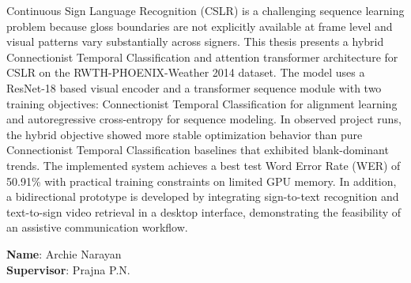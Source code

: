 \begin{singlespace}
Continuous Sign Language Recognition (CSLR) is a challenging sequence learning problem because gloss boundaries are not explicitly available at frame level and visual patterns vary substantially across signers. This thesis presents a hybrid Connectionist Temporal Classification and attention transformer architecture for CSLR on the RWTH-PHOENIX-Weather 2014 dataset. The model uses a ResNet-18 based visual encoder and a transformer sequence module with two training objectives: Connectionist Temporal Classification for alignment learning and autoregressive cross-entropy for sequence modeling. In observed project runs, the hybrid objective showed more stable optimization behavior than pure Connectionist Temporal Classification baselines that exhibited blank-dominant trends. The implemented system achieves a best test Word Error Rate (WER) of 50.91\% with practical training constraints on limited GPU memory. In addition, a bidirectional prototype is developed by integrating sign-to-text recognition and text-to-sign video retrieval in a desktop interface, demonstrating the feasibility of an assistive communication workflow.

\vspace{2cm}
\noindent \textbf{Name}: Archie Narayan \\
\textbf{Supervisor}: Prajna P.N.
\end{singlespace}

\clearpage
